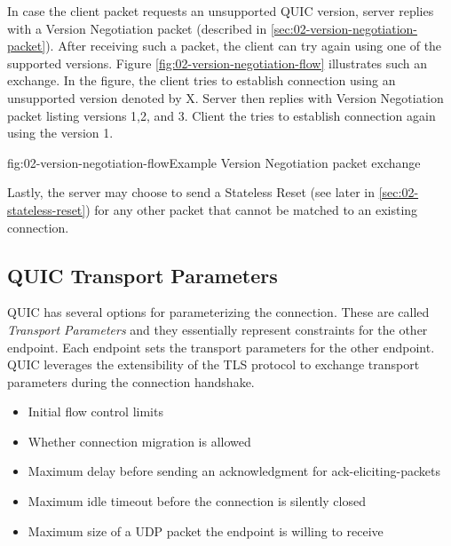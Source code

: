 In case the client packet requests an unsupported QUIC version, server replies with a Version
Negotiation packet (described in \autoref{sec:02-version-negotiation-packet}). After receiving such
a packet, the client can try again using one of the supported versions. Figure
\autoref{fig:02-version-negotiation-flow} illustrates such an exchange. In the figure, the client
tries to establish connection using an unsupported version denoted by X. Server then replies with
Version Negotiation packet listing versions 1,2, and 3. Client the tries to establish connection
again using the version 1.

\begin{myFigure}{fig:02-version-negotiation-flow}{Example Version Negotiation packet exchange}

\resizebox{\linewidth}{!}{}

\end{myFigure}

Lastly, the server may choose to send a Stateless Reset (see later in
\autoref{sec:02-stateless-reset}) for any other packet that cannot be matched to an existing
connection.

\subsection{QUIC Transport Parameters}\label{sec:02-transport-parameters}

QUIC has several options for parameterizing the connection. These are called \textit{Transport
  Parameters} and they essentially represent constraints for the other endpoint. Each endpoint sets
the transport parameters for the other endpoint. QUIC leverages the extensibility of the TLS
protocol to exchange transport parameters during the connection handshake.

\begin{itemize}

  \item Initial flow control limits

  \item Whether connection migration is allowed

  \item Maximum delay before sending an acknowledgment for \glspl{ack-eliciting-packet}

  \item Maximum idle timeout before the connection is silently closed

  \item Maximum size of a UDP packet the endpoint is willing to receive

\end{itemize}

